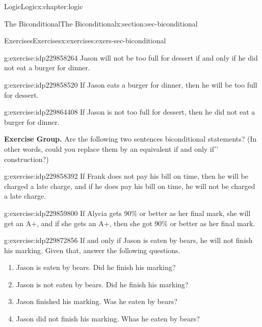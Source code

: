\documentclass[twoside,10pt,]{book}
\numberwithin{equation}{section}
\begin{document}
\begin{chapterptx}{Logic}{}{Logic}{}{}{x:chapter:logic}
\begin{sectionptx}{The Biconditional}{}{The Biconditional}{}{}{x:section:sec-biconditional}
\begin{exercises-subsection}{Exercises}{}{Exercises}{}{}{x:exercises:exers-sec-biconditional}
\begin{exercisegroup}
\begin{divisionexerciseeg}{28}{}{}{g:exercise:idp229858264}
Jason will not be too full for dessert if and only if he did not eat a burger for dinner.\end{divisionexerciseeg}%
\begin{divisionexerciseeg}{29}{}{}{g:exercise:idp229858520}%
If Jason eats a burger for dinner, then he will be too full for dessert.\end{divisionexerciseeg}%
\begin{divisionexerciseeg}{30}{}{}{g:exercise:idp229864408}%
If Jason is not too full for dessert, then he did not eat a burger for dinner.\end{divisionexerciseeg}%
\end{exercisegroup}
\par\medskip\noindent
\par\medskip\noindent%
\textbf{Exercise Group.}\space\space%
Are the following two sentences biconditional statements?  (In other words, could you replace them by an equivalent \textasciigrave{}\textasciigrave{}if and only if'{}'{} construction?)\begin{exercisegroup}
\begin{divisionexerciseeg}{31}{}{}{g:exercise:idp229858392}%
If Frank does not pay his bill on time, then he will be charged a late charge, and if he does pay his bill on time, he will not be charged a late charge.\end{divisionexerciseeg}%
\begin{divisionexerciseeg}{32}{}{}{g:exercise:idp229859800}%
If Alycia gets 90\% or better as her final mark, she will get an A+, and if she gets an A+, then she got 90\% or better as her final mark.\end{divisionexerciseeg}%
\end{exercisegroup}
\par\medskip\noindent
\begin{divisionexercise}{33}{}{}{g:exercise:idp229872856}%
If and only if Jason is eaten by bears, he will not finish his marking.  Given that, answer the following questions. %
\begin{enumerate}[label=(\alph*)]
\item{}Jason is eaten by bears.  Did he finish his marking?%
\item{}Jason is not eaten by bears.  Did he finish his marking?%
\item{}Jason finished his marking.  Was he eaten by bears?%
\item{}Jason did not finish his marking.  Whas he eaten by bears?%
\end{enumerate}

\end{divisionexercise}
\end{exercises-subsection}
\end{sectionptx}
\end{chapterptx}
\end{document}
